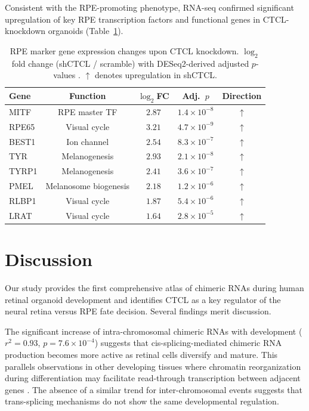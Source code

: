 \documentclass[11pt]{article}
\begin{document}
Consistent with the RPE-promoting phenotype, RNA-seq confirmed significant upregulation of key RPE transcription factors and functional genes in CTCL-knockdown organoids (Table~\ref{tab:rpe_genes}).

\begin{table}[H]
\centering
\caption{RPE marker gene expression changes upon CTCL knockdown. $\log_{2}$ fold change (shCTCL / scramble) with DESeq2-derived adjusted $p$-values \citep{love2014deseq2}. $\uparrow$ denotes upregulation in shCTCL.}
\label{tab:rpe_genes}
\begin{tabular}{lcccc}
\toprule
\textbf{Gene} & \textbf{Function} & \textbf{$\log_{2}$FC} & \textbf{Adj.\ $p$} & \textbf{Direction} \\
\midrule
MITF & RPE master TF & $2.87$ & $1.4 \times 10^{-8}$ & $\uparrow$ \\
RPE65 & Visual cycle & $3.21$ & $4.7 \times 10^{-9}$ & $\uparrow$ \\
BEST1 & Ion channel & $2.54$ & $8.3 \times 10^{-7}$ & $\uparrow$ \\
TYR & Melanogenesis & $2.93$ & $2.1 \times 10^{-8}$ & $\uparrow$ \\
TYRP1 & Melanogenesis & $2.41$ & $3.6 \times 10^{-7}$ & $\uparrow$ \\
PMEL & Melanosome biogenesis & $2.18$ & $1.2 \times 10^{-6}$ & $\uparrow$ \\
RLBP1 & Visual cycle & $1.87$ & $5.4 \times 10^{-6}$ & $\uparrow$ \\
LRAT & Visual cycle & $1.64$ & $2.8 \times 10^{-5}$ & $\uparrow$ \\
\bottomrule
\end{tabular}
\end{table}

\section{Discussion}

Our study provides the first comprehensive atlas of chimeric RNAs during human retinal organoid development and identifies CTCL as a key regulator of the neural retina versus RPE fate decision. Several findings merit discussion.

The significant increase of intra-chromosomal chimeric RNAs with development ($r^{2} = 0.93$, $p = 7.6 \times 10^{-4}$) suggests that cis-splicing-mediated chimeric RNA production becomes more active as retinal cells diversify and mature. This parallels observations in other developing tissues where chromatin reorganization during differentiation may facilitate read-through transcription between adjacent genes \citep{tang2017fusion}. The absence of a similar trend for inter-chromosomal events suggests that trans-splicing mechanisms do not show the same developmental regulation.
\end{document}
